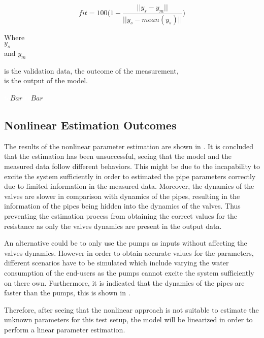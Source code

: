 \begin{equation}
  fit = 100 \bigg(1 - \frac{||y_s - y_m||}{||y_s - mean(y_s)||}\bigg)
  \label{fitequation}
\end{equation} 

\begin{minipage}[t]{0.20\textwidth}
Where\\
\hspace*{8mm} $y_s$ \\
and \hspace*{0.7mm} $y_m$ \\
\end{minipage}
\begin{minipage}[t]{0.68\textwidth}
\vspace*{2mm}
is the validation data, the outcome of the measurement, \\
is the output of the model.\\
\end{minipage}
\begin{minipage}[t]{0.10\textwidth}
\vspace*{2mm}
\textcolor{White}{te}$\unit{Bar}$
\textcolor{White}{te}$\unit{Bar}$
\end{minipage}

\subsection{Nonlinear Estimation Outcomes} 
\label{NonLiOutcome}
The results of the nonlinear parameter estimation are shown in . It is concluded that the estimation has been unsuccessful, seeing that the model and the measured data follow different behaviors. This might be due to the incapability to excite the system sufficiently in order to estimated the pipe parameters correctly due to limited information in the measured data. Moreover, the dynamics of the valves are slower in comparison with dynamics of the pipes, resulting in the information of the pipes being hidden into the dynamics of the valves. Thus preventing the estimation process from obtaining the correct values for the resistance as only the valves dynamics are present in the output data.

An alternative could be to only use the pumps as inputs without affecting the valves dynamics. However in order to obtain accurate values for the parameters, different scenarios have to be simulated which include varying the water consumption of the end-users as the pumps cannot excite the system sufficiently on there own. Furthermore, it is indicated that the dynamics of the pipes are faster than the pumps, this is shown in .

Therefore, after seeing that the nonlinear approach is not suitable to estimate the unknown parameters for this test setup, the model will be linearized in order to perform a linear parameter estimation.